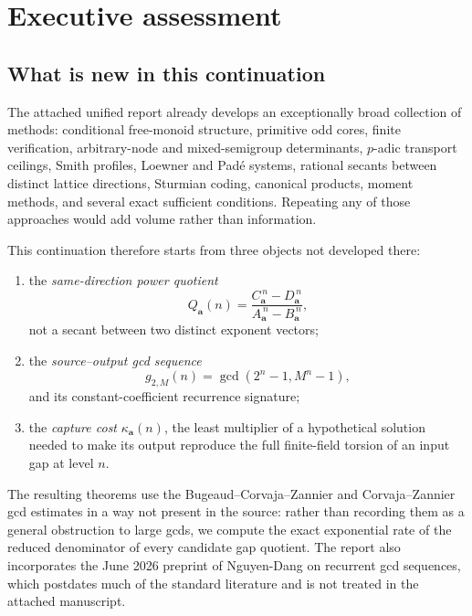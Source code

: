 \documentclass[11pt,oneside]{article}
\theoremstyle{definition}
\theoremstyle{remark}
\begin{document}
\clearpage
{}
\tableofcontents
\clearpage
{}

\section{Executive assessment}
\label{sec:executive}

\subsection{What is new in this continuation}

The attached unified report already develops an exceptionally broad collection of methods:
conditional free-monoid structure, primitive odd cores, finite verification, arbitrary-node
and mixed-semigroup determinants, $p$-adic transport ceilings, Smith profiles, Loewner and
Pad\'e systems, rational secants between distinct lattice directions, Sturmian coding,
canonical products, moment methods, and several exact sufficient conditions.  Repeating any
of those approaches would add volume rather than information.

This continuation therefore starts from three objects not developed there:
\begin{enumerate}[label=\textup{(\roman*)}]
\item the \emph{same-direction power quotient}
\[
 Q_{\mathbf a}(n)=\frac{C_{\mathbf a}^{\,n}-D_{\mathbf a}^{\,n}}
 {A_{\mathbf a}^{\,n}-B_{\mathbf a}^{\,n}},
\]
not a secant between two distinct exponent vectors;
\item the \emph{source--output gcd sequence}
\[
 g_{2,M}(n)=\gcd(2^n-1,M^n-1),
\]
and its constant-coefficient recurrence signature;
\item the \emph{capture cost} $\kappa_{\mathbf a}(n)$, the least multiplier of a
hypothetical solution needed to make its output reproduce the full finite-field torsion of
an input gap at level $n$.
\end{enumerate}

The resulting theorems use the Bugeaud--Corvaja--Zannier and Corvaja--Zannier gcd estimates in
a way not present in the source: rather than recording them as a general obstruction to
large gcds, we compute the exact exponential rate of the reduced denominator of every
candidate gap quotient.  The report also incorporates the June 2026 preprint of
Nguyen-Dang on recurrent gcd sequences, which postdates much of the standard literature and
is not treated in the attached manuscript.
\end{document}
